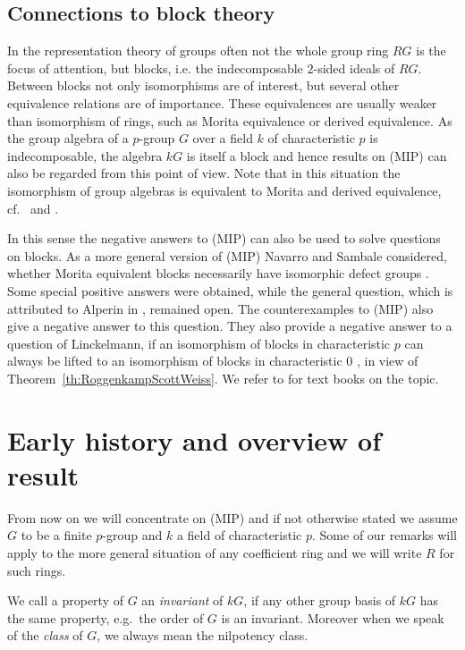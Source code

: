 \documentclass[11pt, a4paper]{amsart}
\theoremstyle{definition}
\begin{document}
\subsection{Connections to block theory}
In the representation theory of groups often not the whole group ring $RG$ is the focus of attention, but blocks, i.e. the indecomposable $2$-sided ideals of $RG$. Between blocks not only isomorphisms are of interest, but several other equivalence relations are of importance. These equivalences are usually weaker than isomorphism of rings, such as Morita equivalence or derived equivalence. As the group algebra of a $p$-group $G$ over a field $k$ of characteristic $p$ is indecomposable, the algebra $kG$ is itself a block and hence results on (MIP) can also be regarded from this point of view. Note that in this situation the isomorphism of group algebras is equivalent to Morita and derived equivalence, cf.\ \cite[Proposition 4.3.5]{ZimmermannBook} and \cite[Corollary 2.13]{RouqierZimmermann}.

In this sense the negative answers to (MIP) can also be used to solve questions on blocks. As a more general version of (MIP) Navarro and Sambale considered, whether Morita equivalent blocks necessarily have isomorphic defect groups \cite{NavarroSambale}. Some special positive answers were obtained, while the general question, which is attributed to Alperin in \cite{Bessenrodt90, Scott90}, remained open. The counterexamples to (MIP) also give a negative answer to this question. They also provide a negative answer to a question of Linckelmann, if an isomorphism of blocks in characteristic $p$ can always be lifted to an isomorphism of blocks in characteristic $0$ \cite[Question 4.9]{LinckelmannSurvey}, in view of Theorem~\ref{th:RoggenkampScottWeiss}. We refer to \cite{NavarroGreen, LinckelmannVolII} for text books on the topic.

\section{Early history and overview of result}\label{sec:History}

From now on we will concentrate on (MIP) and if not otherwise stated we assume $G$ to be a finite $p$-group and $k$ a field of characteristic $p$. Some of our remarks will apply to the more general situation of any coefficient ring and we will write $R$ for such rings.

We call a property of $G$ an \emph{invariant} of $kG$, if any other group basis of $kG$ has the same property, e.g.\ the order of $G$ is an invariant. Moreover when we speak of the \emph{class} of $G$, we always mean the nilpotency class. 
\end{document}
